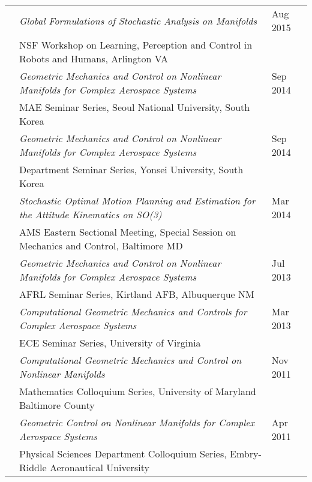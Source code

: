 \documentclass[10pt]{article}
\begin{document}
\begin{tabularx}{\textwidth}{>{\setlength{\hsize}{0.5cm}}X%
>{\setlength{\hsize}{14.3cm}}X%
>{\hfill}X}
& \textit{Global Formulations of Stochastic Analysis on Manifolds} & Aug 2015\\
& {NSF Workshop on Learning, Perception and Control in Robots and Humans}, Arlington VA\vspace*{0.1cm}\\


& \textit{Geometric Mechanics and Control on Nonlinear Manifolds for Complex Aerospace Systems} & Sep 2014\\
& {MAE Seminar Series, Seoul National University}, South Korea\vspace*{0.1cm}\\


& \textit{Geometric Mechanics and Control on Nonlinear Manifolds for Complex Aerospace Systems} & Sep 2014\\
& {Department Seminar Series, Yonsei University}, South Korea\vspace*{0.1cm}\\


& \textit{Stochastic Optimal Motion Planning and Estimation for the Attitude Kinematics on SO(3)} & Mar 2014\\
& {AMS Eastern Sectional Meeting, Special Session on Mechanics and Control}, Baltimore MD\vspace*{0.1cm}\\


& \textit{Geometric Mechanics and Control on Nonlinear Manifolds for Complex Aerospace Systems
} & Jul 2013\\
& {AFRL Seminar Series}, Kirtland AFB, Albuquerque NM\vspace*{0.1cm}\\


& \textit{Computational Geometric Mechanics and Controls for Complex Aerospace Systems
} & Mar 2013\\
& {ECE Seminar Series}, University of Virginia\vspace*{0.1cm}\\

& \textit{Computational Geometric Mechanics and Control on Nonlinear Manifolds
} & Nov 2011\\
& {Mathematics Colloquium Series}, University of Maryland Baltimore County\vspace*{0.1cm}\\

& \textit{Geometric Control on Nonlinear Manifolds
for Complex Aerospace Systems
} & Apr 2011\\
& {Physical Sciences Department Colloquium Series}, Embry-Riddle Aeronautical University\vspace*{0.1cm}\\


\end{tabularx}
\end{document}
